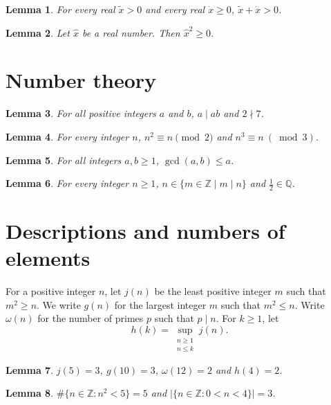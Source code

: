 \documentclass{article}
\newtheorem{lemma}{Lemma}
\begin{document}
\begin{lemma}\label{accents}
For every real $\tilde x>0$ and every real $\dot x\ge0$, $\tilde x+\dot x>0$.
\end{lemma}

\begin{lemma}\label{hat-name}
Let $\hat x$ be a real number. Then $\hat x^2\ge0$.
\end{lemma}

\section{Number theory}

\begin{lemma}\label{divides}
For all positive integers $a$ and $b$, $a\mid ab$ and $2\nmid 7$.
\end{lemma}

\begin{lemma}\label{congruence}
For every integer $n$, $n^2\equiv n\pmod 2$ and $n^3\equiv n\ (\bmod 3)$.
\end{lemma}

\begin{lemma}\label{gcd}
For all integers $a,b\ge1$, $\gcd(a,b)\le a$.
\end{lemma}

\begin{lemma}\label{divisors}
For every integer $n\ge1$, $n\in\{m\in\mathbb Z\mid m\mid n\}$ and $\tfrac12\in\mathbb Q$.
\end{lemma}

\section{Descriptions and numbers of elements}

For a positive integer $n$, let $j(n)$ be the least positive integer $m$ such that $m^2\ge n$.
We write $g(n)$ for the largest integer $m$ such that $m^2\le n$.
Write $\omega(n)$ for the number of primes $p$ such that $p\mid n$.
For $k\ge1$, let
\[
 h(k)=\sup_{\substack{n\ge1\\ n\le k}} j(n).
\]

\begin{lemma}\label{least}
$j(5)=3$, $g(10)=3$, $\omega(12)=2$ and $h(4)=2$.
\end{lemma}

\begin{lemma}\label{count}
$\#\{n\in\mathbb Z : n^2<5\}=5$ and $|\{n\in\mathbb Z : 0<n<4\}|=3$.
\end{lemma}
\end{document}
